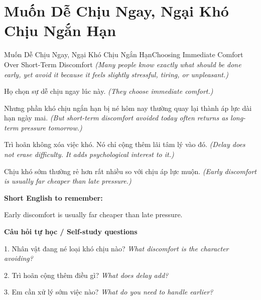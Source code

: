 \section{Muốn Dễ Chịu Ngay, Ngại Khó Chịu Ngắn Hạn}
\begin{truyen}{Muốn Dễ Chịu Ngay, Ngại Khó Chịu Ngắn Hạn}{Choosing Immediate Comfort Over Short-Term Discomfort}
\textit{(Many people know exactly what should be done early, yet avoid it because it feels slightly stressful, tiring, or unpleasant.)}

Họ chọn sự dễ chịu ngay lúc này.
\textit{(They choose immediate comfort.)}

Nhưng phần khó chịu ngắn hạn bị né hôm nay thường quay lại thành áp lực dài hạn ngày mai.
\textit{(But short-term discomfort avoided today often returns as long-term pressure tomorrow.)}

Trì hoãn không xóa việc khó. Nó chỉ cộng thêm lãi tâm lý vào đó.
\textit{(Delay does not erase difficulty. It adds psychological interest to it.)}

\end{truyen}

\begin{baihoc}
Chịu khó sớm thường rẻ hơn rất nhiều so với chịu áp lực muộn.
\textit{(Early discomfort is usually far cheaper than late pressure.)}
\end{baihoc}

\begin{ghinhoanh}
\textbf{Short English to remember:}

Early discomfort is usually far cheaper than late pressure.

\end{ghinhoanh}

\begin{tuhocnhanh}
\textbf{Câu hỏi tự học / Self-study questions}

1. Nhân vật đang né loại khó chịu nào? \textit{What discomfort is the character avoiding?}

2. Trì hoãn cộng thêm điều gì? \textit{What does delay add?}

3. Em cần xử lý sớm việc nào? \textit{What do you need to handle earlier?}
\end{tuhocnhanh}
\ngancach

